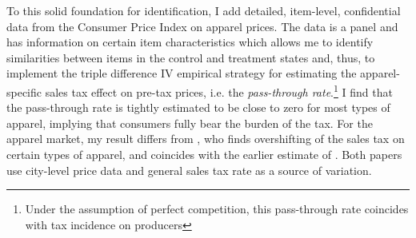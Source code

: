 \documentclass[12pt]{article}
\begin{document}
		
		
		
		To this solid foundation for identification, I add detailed, item-level, confidential data from the Consumer Price Index on apparel prices. The data is a panel and has information on certain item characteristics which allows me to identify similarities between items in the control and treatment states and, thus, to implement the triple difference IV empirical strategy for estimating the apparel-specific sales tax effect on pre-tax prices, i.e. the \emph{pass-through rate}.\footnote{Under the assumption of perfect competition, this pass-through rate coincides with tax incidence on producers} I find that the pass-through rate is tightly estimated to be close to zero for most types of apparel, implying that consumers fully bear the burden of the tax. For the apparel market, my result differs from \citet{besley}, who finds overshifting of the sales tax on certain types of apparel, and coincides with the earlier estimate of \citet{poterba}. Both papers use city-level price data and general sales tax rate as a source of variation. 
		
		
		
		
		
\end{document}

